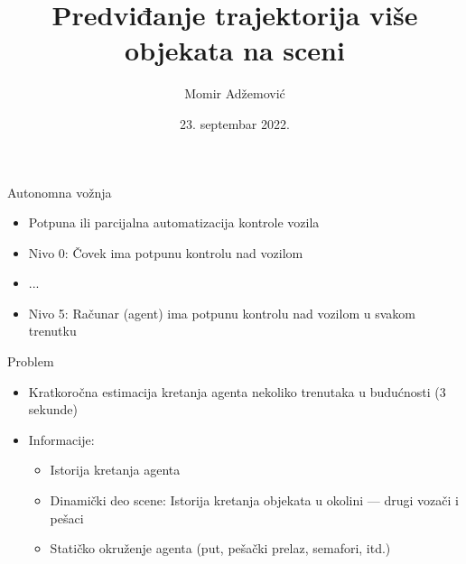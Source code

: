 \documentclass[bookmarks=true,bookmarksopen=true,pdfborder={0 0 0},pdfhighlight={/N},linkbordercolor={.5 .5 .5},implicit=false,unicode,xcolor={table}]{beamer}
\begin{document}
\title{Predviđanje trajektorija više objekata na sceni}
\author{Momir Adžemović}
\subtitle{}
\date{23. septembar 2022.}

\begin{frame}

  \titlepage{}

\end{frame} 

\begin{frame}{Autonomna vožnja}

  \begin{itemize}
    \item Potpuna ili parcijalna automatizacija kontrole vozila
    \item Nivo 0: Čovek ima potpunu kontrolu nad vozilom
    \item ...
    \item Nivo 5: Računar (agent) ima potpunu kontrolu nad vozilom u svakom trenutku
  \end{itemize}

\end{frame}

\begin{frame}{Problem}

  \begin{itemize}
    \item Kratkoročna estimacija kretanja agenta nekoliko trenutaka u budućnosti (3 sekunde)
    \item Informacije:
      \begin{itemize}
        \item Istorija kretanja agenta
        \item Dinamički deo scene: Istorija kretanja objekata u okolini --- drugi vozači i pešaci
        \item Statičko okruženje agenta (put, pešački prelaz, semafori, itd.)
      \end{itemize}
  \end{itemize}

\end{frame}
\end{document}
